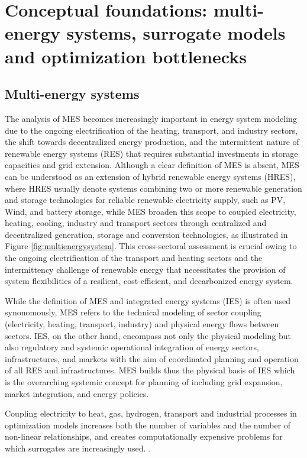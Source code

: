 \section{Conceptual foundations: multi-energy systems, surrogate models and optimization bottlenecks}

\subsection{Multi-energy systems}

The analysis of MES becomes increasingly important in energy system
modeling due to the ongoing electrification of the heating, transport,
and industry sectors, the shift towards decentralized energy production,
and the intermittent nature of renewable energy systems (RES) that
requires substantial investments in storage capacities and grid
extension. Although a clear definition of MES is absent, MES can be
understood as an extension of hybrid renewable energy systems (HRES),
where HRES usually denote systems combining two or more renewable
generation and storage technologies for reliable renewable electricity
supply, such as PV, Wind, and battery storage, while MES broaden this
scope to coupled electricity, heating, cooling, industry and transport
sectors through centralized and decentralized generation, storage and
conversion technologies, as illustrated in Figure
\ref{fig:multienergysystem}. This cross-sectoral assessment is
crucial owing to the ongoing electrification of the transport and
heating sectors and the intermittency challenge of renewable energy that
necessitates the provision of system flexibilities of a resilient,
cost-efficient, and decarbonized energy system.

While the definition of MES and integrated energy systems (IES) is often
used synonomously, MES refers to the technical modeling of sector
coupling (electricity, heating, transport, industry) and physical energy
flows between sectors. IES, on the other hand, encompass not only the
physical modeling but also regulatory and systemic operational
integration of energy sectors, infrastructures, and markets with the aim
of coordinated planning and operation of all RES and infrastructures.
MES builds thus the physical basis of IES which is the overarching
systemic concept for planning of including grid expansion, market
integration, and energy policies.

Coupling electricity to heat, gas, hydrogen, transport and industrial
processes in optimization models increases both the number of variables
and the number of non-linear relationships, and creates computationally
expensive problems for which surrogates are increasingly used.
\cite{Zhou20181,Zheng20231907,Ren2024,Jalving2023,Dong2023,Yin2024,Cao2023,Wang2020202933}.

